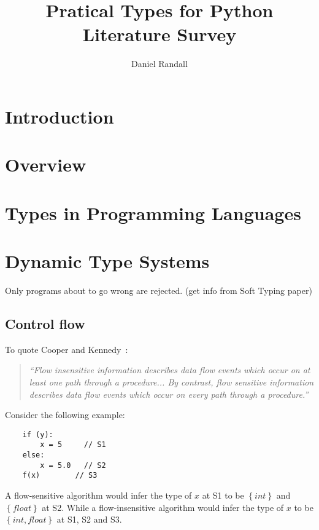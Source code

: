 \documentclass[12pt, titlepage]{article}
\title{Pratical Types for Python \\ Literature Survey}
\author{Daniel Randall}
\date{}
\begin{document}
\maketitle

\tableofcontents
\newpage

\section{Introduction}



\section{Overview}



\section{Types in Programming Languages}

\section{Dynamic Type Systems}
Only programs about to go wrong are rejected. (get info from Soft Typing paper)

\subsection{Control flow}
To quote Cooper and Kennedy~\cite{controlFlowCooperKennedy}:
\begin{quote}
	\emph{``Flow insensitive information describes data flow events which occur on at least one path through a procedure... By contrast, flow sensitive information describes data flow events which occur on every path through a procedure.''}
\end{quote}
Consider the following example:
\begin{lstlisting}
	if (y):	
		x = 5     // S1
	else:
		x = 5.0   // S2
	f(x)		// S3
\end{lstlisting}
A flow-sensitive algorithm would infer the type of $x$ at S1 to be $\left\{ {int}\right\}$ and $\left\{ {float}\right\}$ at S2. While a flow-insensitive algorithm would infer the type of $x$ to be $\left\{ {int, float}\right\}$ at S1, S2 and S3.
\end{document}

